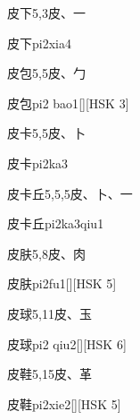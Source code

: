 \begin{Entry}{皮下}{5,3}{⽪、⼀}
  \begin{Phonetics}{皮下}{pi2xia4}
  \end{Phonetics}
\end{Entry}

\begin{Entry}{皮包}{5,5}{⽪、⼓}
  \begin{Phonetics}{皮包}{pi2 bao1}[][HSK 3]
  \end{Phonetics}
\end{Entry}

\begin{Entry}{皮卡}{5,5}{⽪、⼘}
  \begin{Phonetics}{皮卡}{pi2ka3}
  \end{Phonetics}
\end{Entry}

\begin{Entry}{皮卡丘}{5,5,5}{⽪、⼘、⼀}
  \begin{Phonetics}{皮卡丘}{pi2ka3qiu1}
  \end{Phonetics}
\end{Entry}

\begin{Entry}{皮肤}{5,8}{⽪、⾁}
  \begin{Phonetics}{皮肤}{pi2fu1}[][HSK 5]
  \end{Phonetics}
\end{Entry}

\begin{Entry}{皮球}{5,11}{⽪、⽟}
  \begin{Phonetics}{皮球}{pi2 qiu2}[][HSK 6]
  \end{Phonetics}
\end{Entry}

\begin{Entry}{皮鞋}{5,15}{⽪、⾰}
  \begin{Phonetics}{皮鞋}{pi2xie2}[][HSK 5]
  \end{Phonetics}
\end{Entry}

